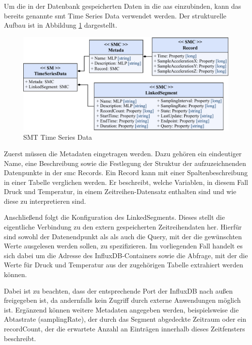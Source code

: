 Um die in der Datenbank gespeicherten Daten in die \acs{aas} einzubinden, kann das bereits genannte \acs{smt} Time Series Data verwendet werden.
Der strukturelle Aufbau ist in Abbildung \ref{fig:SMTTimeSeriesData} dargestellt.

\begin{figure}[htbp]
    \centering
    \includegraphics[width=1\textwidth]{Bilder/TimeSeries/SM_TimeSeriesData.pdf}
    \caption{SMT Time Series Data}
    \label{fig:SMTTimeSeriesData}
\end{figure}

Zuerst müssen die Metadaten eingetragen werden. 
Dazu gehören ein eindeutiger Name, eine Beschreibung sowie die Festlegung der Struktur der aufzuzeichnenden Datenpunkte in der \acs{smc} Records.
Ein Record kann mit einer Spaltenbeschreibung in einer Tabelle verglichen werden.
Er beschreibt, welche Variablen, in diesem Fall Druck und Temperatur, in einem Zeitreihen-Datensatz enthalten sind und wie diese zu interpretieren sind.

Anschließend folgt die Konfiguration des LinkedSegments. 
Dieses stellt die eigentliche Verbindung zu den extern gespeicherten Zeitreihendaten her.
Hierfür sind sowohl der Datenendpunkt als als auch die Query, mit der die gewünschten Werte ausgelesen werden sollen, zu spezifizieren.
Im vorliegenden Fall handelt es sich dabei um die Adresse des InfluxDB-Containers sowie die Abfrage, mit der die Werte für Druck und Temperatur aus der zugehörigen Tabelle extrahiert werden können.

Dabei ist zu beachten, dass der entsprechende Port der InfluxDB nach außen freigegeben ist, da andernfalls kein Zugriff durch externe Anwendungen möglich ist.
Ergänzend können weitere Metadaten angegeben werden, beispielsweise die Abtastrate (samplingRate), der durch das Segment abgedeckte Zeitraum oder ein recordCount, der die erwartete Anzahl an Einträgen innerhalb dieses Zeitfensters beschreibt.

